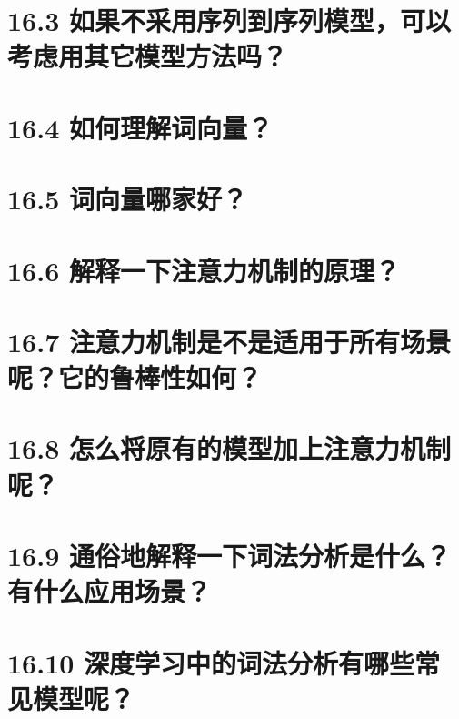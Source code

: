 \section{16.3
如果不采用序列到序列模型，可以考虑用其它模型方法吗？}\label{ux5982ux679cux4e0dux91c7ux7528ux5e8fux5217ux5230ux5e8fux5217ux6a21ux578bux53efux4ee5ux8003ux8651ux7528ux5176ux5b83ux6a21ux578bux65b9ux6cd5ux5417}

\section{16.4
如何理解词向量？}\label{ux5982ux4f55ux7406ux89e3ux8bcdux5411ux91cf}

\section{16.5
词向量哪家好？}\label{ux8bcdux5411ux91cfux54eaux5bb6ux597d}

\section{16.6
解释一下注意力机制的原理？}\label{ux89e3ux91caux4e00ux4e0bux6ce8ux610fux529bux673aux5236ux7684ux539fux7406}

\section{16.7
注意力机制是不是适用于所有场景呢？它的鲁棒性如何？}\label{ux6ce8ux610fux529bux673aux5236ux662fux4e0dux662fux9002ux7528ux4e8eux6240ux6709ux573aux666fux5462ux5b83ux7684ux9c81ux68d2ux6027ux5982ux4f55}

\section{16.8
怎么将原有的模型加上注意力机制呢？}\label{ux600eux4e48ux5c06ux539fux6709ux7684ux6a21ux578bux52a0ux4e0aux6ce8ux610fux529bux673aux5236ux5462}

\section{16.9
通俗地解释一下词法分析是什么？有什么应用场景？}\label{ux901aux4fd7ux5730ux89e3ux91caux4e00ux4e0bux8bcdux6cd5ux5206ux6790ux662fux4ec0ux4e48ux6709ux4ec0ux4e48ux5e94ux7528ux573aux666f}

\section{16.10
深度学习中的词法分析有哪些常见模型呢？}\label{ux6df1ux5ea6ux5b66ux4e60ux4e2dux7684ux8bcdux6cd5ux5206ux6790ux6709ux54eaux4e9bux5e38ux89c1ux6a21ux578bux5462}

